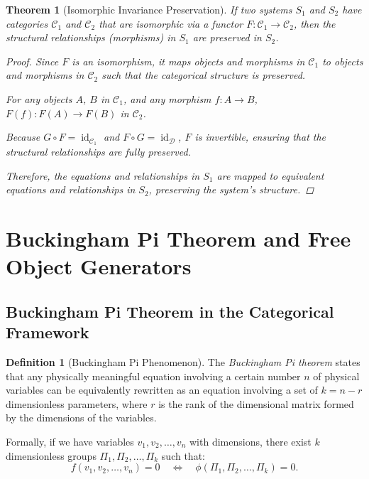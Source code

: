 \documentclass{article}
\newtheorem{theorem}{Theorem}[section]
\theoremstyle{definition}
\newtheorem{definition}{Definition}[section]
\theoremstyle{remark}
\begin{document}
	\begin{theorem}[Isomorphic Invariance Preservation]
		If two systems $S_1$ and $S_2$ have categories $\mathcal{C}_1$ and $\mathcal{C}_2$ that are isomorphic via a functor $F: \mathcal{C}_1 \rightarrow \mathcal{C}_2$, then the structural relationships (morphisms) in $S_1$ are preserved in $S_2$.
		
		\begin{proof}
			Since $F$ is an isomorphism, it maps objects and morphisms in $\mathcal{C}_1$ to objects and morphisms in $\mathcal{C}_2$ such that the categorical structure is preserved.
			
			For any objects $A$, $B$ in $\mathcal{C}_1$, and any morphism $f: A \rightarrow B$, $F(f): F(A) \rightarrow F(B)$ in $\mathcal{C}_2$.
			
			Because $G \circ F = \operatorname{id}_{\mathcal{C}_1}$ and $F \circ G = \operatorname{id}_{\mathcal{D}}$, $F$ is invertible, ensuring that the structural relationships are fully preserved.
			
			Therefore, the equations and relationships in $S_1$ are mapped to equivalent equations and relationships in $S_2$, preserving the system's structure.
		\end{proof}
	\end{theorem}
	
	\section{Buckingham Pi Theorem and Free Object Generators}
	
	\subsection{Buckingham Pi Theorem in the Categorical Framework}
	
	\begin{definition}[Buckingham Pi Phenomenon]
		The \emph{Buckingham Pi theorem} states that any physically meaningful equation involving a certain number $n$ of physical variables can be equivalently rewritten as an equation involving a set of $k = n - r$ dimensionless parameters, where $r$ is the rank of the dimensional matrix formed by the dimensions of the variables.
		
		Formally, if we have variables $v_1, v_2, \dots, v_n$ with dimensions, there exist $k$ dimensionless groups $\Pi_1, \Pi_2, \dots, \Pi_k$ such that:
		\[
		f(v_1, v_2, \dots, v_n) = 0 \quad \iff \quad \phi(\Pi_1, \Pi_2, \dots, \Pi_k) = 0.
		\]
	\end{definition}
	
\end{document}
